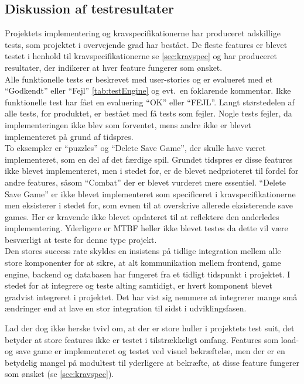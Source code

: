 \subsection{Diskussion af testresultater}
Projektets implementering og kravspecifikationerne har produceret adskillige tests, som 
projektet i overvejende grad har bestået. De fleste features er blevet
testet i henhold til kravspecifikationerne se \autoref{sec:kravspec} og har produceret 
resultater, der indikerer at hver feature fungerer som ønsket. \\

Alle funktionelle tests er beskrevet med user-stories og er evalueret med et ``Godkendt''
eller ``Fejl'' \autoref{tab:testEngine} og evt.\ en foklarende kommentar. Ikke funktionelle 
test har fået en evaluering ``OK'' eller ``FEJL''.
Langt størstedelen af alle tests, for produktet, er bestået med få tests som fejler. 
Nogle tests fejler, da implementeringen ikke blev som forventet, mens andre ikke er blevet 
implementeret på grund af tidspres. \\

To eksempler er ``puzzles'' og ``Delete Save Game'', der skulle have været implementeret, som en del af det færdige spil.
Grundet tidspres er disse features ikke blevet implementeret, men i stedet for, er de blevet
nedprioteret til fordel for andre features, såsom ``Combat'' der er blevet vurderet mere essentiel.
``Delete Save Game'' er ikke blevet implementeret som specificeret i kravspecifikationerne men
eksisterer i stedet for, som evnen til at overskrive allerede eksisterende save games. Her er 
kravende ikke blevet opdateret til at reflektere den anderledes implementering. Yderligere er MTBF heller ikke blevet testes da dette vil være besværligt at teste for denne type projekt.\\

Den stores success rate skyldes en insistens på tidlige integration mellem alle store komponenter for at sikre, at 
alt kommunikation mellem frontend, game engine, backend og databasen har fungeret fra et tidligt 
tidspunkt i projektet. I stedet for at integrere og teste alting samtidigt, er hvert komponent 
blevet gradvist integreret i projektet. Det har vist sig nemmere at integrerer mange små ændringer
end at lave en stor integration til sidst i udviklingsfasen.

Lad der dog ikke herske tvivl om, at der er store huller i projektets test suit, det
betyder at store features ikke er testet i tilstrækkeligt omfang. Features som load- og save game er implementeret og testet ved visuel bekræftelse, men der er en betydelig mangel på modultest til yderligere at bekræfte, at disse feature fungerer som ønsket (se \autoref{sec:kravspec}). \\
